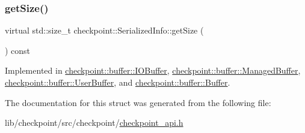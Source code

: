 \subsubsection{\texorpdfstring{get\+Size()}{getSize()}}
{\footnotesize\ttfamily virtual std\+::size\+\_\+t checkpoint\+::\+Serialized\+Info\+::get\+Size (\begin{DoxyParamCaption}{ }\end{DoxyParamCaption}) const\hspace{0.3cm}{\ttfamily [pure virtual]}}



Implemented in \hyperlink{structcheckpoint_1_1buffer_1_1_i_o_buffer_a65774dab5b6397ae40b77282729fde2f}{checkpoint\+::buffer\+::\+I\+O\+Buffer}, \hyperlink{structcheckpoint_1_1buffer_1_1_managed_buffer_a26f85bcd885624b7c0ad6fd8572ad466}{checkpoint\+::buffer\+::\+Managed\+Buffer}, \hyperlink{structcheckpoint_1_1buffer_1_1_user_buffer_a434e7feda041957509ee08791d3f4949}{checkpoint\+::buffer\+::\+User\+Buffer}, and \hyperlink{structcheckpoint_1_1buffer_1_1_buffer_a8f21655f43c4424cd88435ddebbb2d3c}{checkpoint\+::buffer\+::\+Buffer}.



The documentation for this struct was generated from the following file\+:\begin{DoxyCompactItemize}
\item 
lib/checkpoint/src/checkpoint/\hyperlink{checkpoint__api_8h}{checkpoint\+\_\+api.\+h}\end{DoxyCompactItemize}

